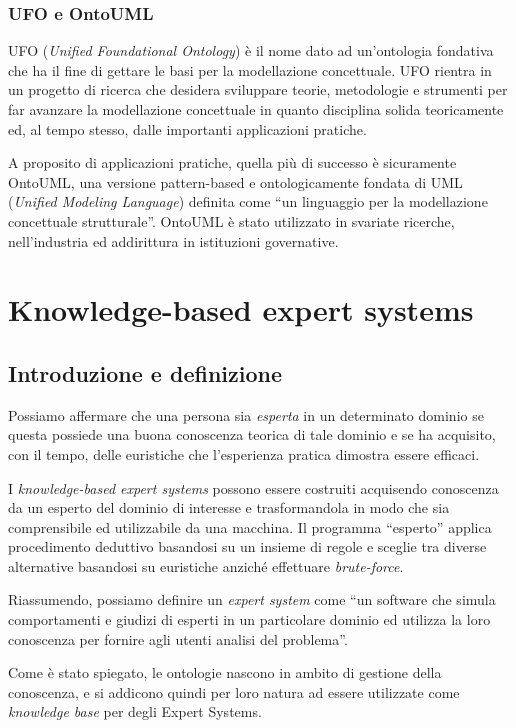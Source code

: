 \subsubsection{UFO e OntoUML}
UFO (\textit{Unified Foundational Ontology}) è il nome dato ad un'ontologia fondativa che ha il fine di gettare le basi per la modellazione concettuale\cite{guizzardi2015}. UFO rientra in un progetto di ricerca che desidera sviluppare teorie, metodologie e strumenti per far avanzare la modellazione concettuale in quanto disciplina solida teoricamente ed, al tempo stesso, dalle importanti applicazioni pratiche.

A proposito di applicazioni pratiche, quella più di successo è sicuramente OntoUML\cite{guizzardi2015}, una versione pattern-based e ontologicamente fondata di UML\cite{uml} (\textit{Unified Modeling Language}) definita come ``un linguaggio per la modellazione concettuale strutturale''. {OntoUML} è stato utilizzato in svariate ricerche, nell'industria ed addirittura in istituzioni governative.\cite{guizzardi2015}


\section{Knowledge-based expert systems}
\subsection{Introduzione e definizione}
Possiamo affermare che una persona sia \textit{esperta} in un determinato dominio se questa possiede una buona conoscenza teorica di tale dominio e se ha acquisito, con il tempo, delle euristiche che l'esperienza pratica dimostra essere efficaci.

I \textit{knowledge-based expert systems} possono essere costruiti acquisendo conoscenza da un esperto del dominio di interesse e trasformandola in modo che sia comprensibile ed utilizzabile da una macchina. Il programma ``esperto'' applica procedimento deduttivo basandosi su un insieme di regole e sceglie tra diverse alternative basandosi su euristiche anziché effettuare \textit{brute-force}.\cite{aniba2008knowledge}

Riassumendo, possiamo definire un \textit{expert system} come ``un software che simula comportamenti e giudizi di esperti in un particolare dominio ed utilizza la loro conoscenza per fornire agli utenti analisi del problema''\cite{aniba2008knowledge}.

Come è stato spiegato, le ontologie nascono in ambito di gestione della conoscenza, e si addicono quindi per loro natura ad essere utilizzate come \textit{knowledge base} per degli Expert Systems.


